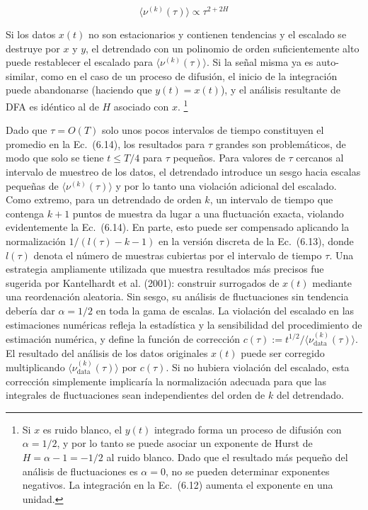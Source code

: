 \documentclass[10pt,a4paper]{book}
\begin{document}
\begin{equation}
\langle \nu^{(k)}(\tau) \rangle \propto \tau^{2+2H}
\end{equation}

Si los datos \( x(t) \) no son estacionarios y contienen tendencias y el escalado se destruye por \( x \) y \( y \), el detrendado con un polinomio de orden suficientemente alto puede restablecer el escalado para \( \langle \nu^{(k)}(\tau) \rangle \). Si la señal misma ya es auto-similar, como en el caso de un proceso de difusión, el inicio de la integración puede abandonarse (haciendo que \( y(t) = x(t) \)), y el análisis resultante de DFA es idéntico al de \( H \) asociado con \( x \). \footnote{Si \( x \) es ruido blanco, el \( y(t) \) integrado forma un proceso de difusión con \( \alpha = 1/2 \), y por lo tanto se puede asociar un exponente de Hurst de \( H = \alpha - 1 = -1/2 \) al ruido blanco. Dado que el resultado más pequeño del análisis de fluctuaciones es \( \alpha = 0 \), no se pueden determinar exponentes negativos. La integración en la Ec.~(6.12) aumenta el exponente en una unidad.} 

\newpage

Dado que \( \tau = O(T) \) solo unos pocos intervalos de tiempo constituyen el promedio en la Ec.~(6.14), los resultados para \( \tau \) grandes son problemáticos, de modo que solo se tiene \( t \leq T/4 \) para \( \tau \) pequeños. Para valores de \( \tau \) cercanos al intervalo de muestreo de los datos, el detrendado introduce un sesgo hacia escalas pequeñas de \( \langle \nu^{(k)}(\tau) \rangle \) y por lo tanto una violación adicional del escalado. Como extremo, para un detrendado de orden \( k \), un intervalo de tiempo que contenga \( k + 1 \) puntos de muestra da lugar a una fluctuación exacta, violando evidentemente la Ec.~(6.14). En parte, esto puede ser compensado aplicando la normalización \( 1 / (l(\tau) - k - 1) \) en la versión discreta de la Ec.~(6.13), donde \( l(\tau) \) denota el número de muestras cubiertas por el intervalo de tiempo \( \tau \). Una estrategia ampliamente utilizada que muestra resultados más precisos fue sugerida por Kantelhardt et al. (2001): construir surrogados de \( x(t) \) mediante una reordenación aleatoria. Sin sesgo, su análisis de fluctuaciones sin tendencia debería dar \( \alpha = 1/2 \) en toda la gama de escalas. La violación del escalado en las estimaciones numéricas refleja la estadística y la sensibilidad del procedimiento de estimación numérica, y define la función de corrección \( c(\tau) := t^{1/2} / \langle \nu^{(k)}_{\text{data}}(\tau) \rangle \). El resultado del análisis de los datos originales \( x(t) \) puede ser corregido multiplicando \( \langle \nu^{(k)}_{\text{data}}(\tau) \rangle \) por \( c(\tau) \). Si no hubiera violación del escalado, esta corrección simplemente implicaría la normalización adecuada para que las integrales de fluctuaciones sean independientes del orden de \( k \) del detrendado.
\end{document}
